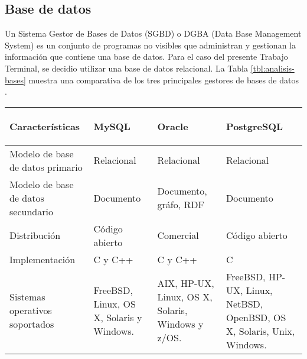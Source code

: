\subsection{Base de datos}

Un Sistema Gestor de Bases de Datos (SGBD) o DGBA (Data Base Management System) es un conjunto de programas no visibles que administran y gestionan la información que contiene una base de datos. Para el caso del presente Trabajo Terminal, se decidio utilizar una base de datos relacional. La Tabla \ref{tbl:analisis-bases} muestra una comparativa de los tres principales gestores de bases de datos \cite{basesComparacion}.

\begin{center}
    \begin{longtable}{|m{3.5cm}|m{3.5cm}|m{3.5cm}|m{3.5cm}|}
    
    \hline
    \begin{center}
        \textbf{Características}
    \end{center}                &
    \begin{center}
        \textbf{MySQL}
    \end{center}                &
    \begin{center}
        \textbf{Oracle}
    \end{center}                &
    \begin{center}
        \textbf{PostgreSQL}
    \end{center} \\
    
    \hline
    Modelo de base de datos primario    &
    Relacional                          &
    Relacional                          &
    Relacional  \\
    
    \hline
    Modelo de base de datos secundario  &
    Documento                           &
    Documento, gráfo, RDF               &
    Documento \\
    
    \hline
    Distribución                        &
    Código abierto                      &
    Comercial                           &
    Código abierto \\
    
    \hline
    Implementación                      &
    C y C++                             &
    C y C++                             &
    C \\
    
    \hline
    Sistemas operativos soportados           &
    FreeBSD, Linux, OS X, Solaris y Windows. &
    AIX, HP-UX, Linux, OS X, Solaris, 
    Windows y z/OS.                          &
    FreeBSD, HP-UX, Linux, NetBSD, 
    OpenBSD, OS X, Solaris, Unix, Windows. \\
    

\end{longtable}
\end{center}
